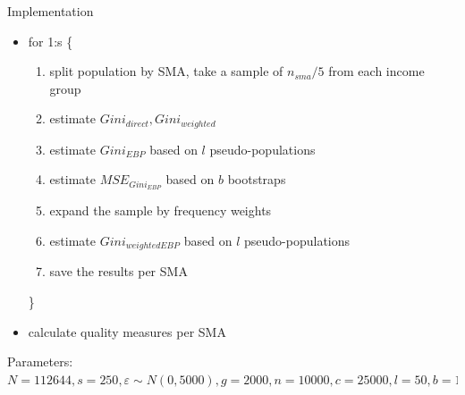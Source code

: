 \documentclass[fleqn,final]{beamer}
\newcommand{\Pheight}{\rule[-5mm]{0cm}{1cm}}
\begin{document}
\begin{frame}
\begin{columns}[t]
\begin{column}{.3\linewidth}
\begin{block}{Implementation \Pheight}
\begin{itemize}
\item for 1:s \{
\begin{enumerate}  %
\item split population by SMA, take a sample of $n_{sma} / 5$ from each income group
\item estimate $Gini_{direct}, Gini_{weighted}$
\item estimate $Gini_{EBP}$  based on $l$ pseudo-populations
\item estimate $MSE_{Gini_{EBP}}$ based on $b$ bootstraps
\item expand the sample by frequency weights
\item estimate $Gini_{weighted EBP}$  based on $l$ pseudo-populations
\item save the results per SMA
\end{enumerate}
\}
 
\item calculate quality measures per SMA 
 \end{itemize}
Parameters: $N=112644, s=250, \varepsilon \sim N(0,5000), g=2000, n=10000, c=25000, l=50, b=10, SMA=District$
\end{block}



 
\end{column}



%
%
  
\end{columns}  



\begin{columns}[t]

%


\begin{column}{.3\linewidth}


\end{column}
\end{columns}
\end{frame}
\end{document}
